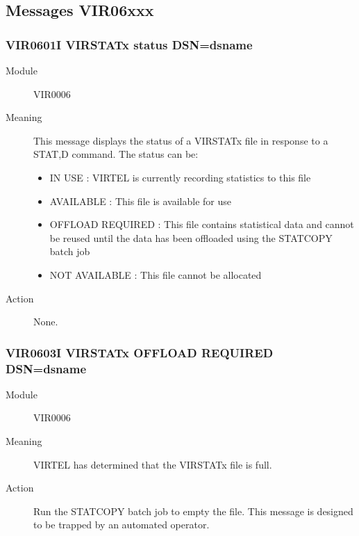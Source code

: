 \documentclass[letterpaper,10pt,english]{sphinxmanual}
\begin{document}
\subsection{Messages VIR06xxx}
\label{\detokenize{messages:messages-vir06xxx}}

\subsubsection{VIR0601I VIRSTATx status DSN=dsname}
\label{\detokenize{messages:vir0601i-virstatx-status-dsn-dsname}}\begin{description}
\item[{Module}] \leavevmode
VIR0006

\item[{Meaning}] \leavevmode
This message displays the status of a VIRSTATx file in response to a STAT,D command. The status can be:
\begin{itemize}
\item {} 
IN USE : VIRTEL is currently recording statistics to this file

\item {} 
AVAILABLE : This file is available for use

\item {} 
OFFLOAD REQUIRED : This file contains statistical data and cannot be reused until the data has been offloaded using the STATCOPY batch job

\item {} 
NOT AVAILABLE : This file cannot be allocated

\end{itemize}

\item[{Action}] \leavevmode
None.

\end{description}


\subsubsection{VIR0603I VIRSTATx OFFLOAD REQUIRED DSN=dsname}
\label{\detokenize{messages:vir0603i-virstatx-offload-required-dsn-dsname}}\begin{description}
\item[{Module}] \leavevmode
VIR0006

\item[{Meaning}] \leavevmode
VIRTEL has determined that the VIRSTATx file is full.

\item[{Action}] \leavevmode
Run the STATCOPY batch job to empty the file. This message is designed to be trapped by an automated operator.

\end{description}
\end{document}
